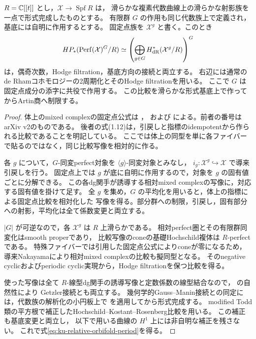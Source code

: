 \begin{lemma}[相対固定点比較]
\label{lem:ku-relative-orbifold-period}
$R=\mathbb C[[t]]$ とし，$\mathcal X\to\operatorname{Spf}R$ は，
滑らかな複素代数曲線上の滑らかな射影族を一点で形式完成したものとする。
有限群 $G$ の作用も同じ代数族上で定義され，基底には自明に作用するとする。
固定点族を $\mathcal X^g$ と書く。このとき
\begin{equation}\label{eq:ku-relative-orbifold-period}
 HP_*(\operatorname{Perf}(\mathcal X)^G/R)
 \simeq
 \left(\bigoplus_{g\in G}
 H^*_{\mathrm{dR}}(\mathcal X^g/R)\right)^G
\end{equation}
は，偶奇次数，Hodge filtration，基底方向の接続と両立する。
右辺には通常のde Rhamコホモロジーの2周期化とそのHodge filtrationを用いる。
ここで $G$ は固定点成分の添字に共役で作用する。
この比較を滑らかな形式基底上で作ってからArtin商へ制限する。
\end{lemma}
\begin{proof}
体上のmixed complexの固定点公式は
\cite[Theorem~1, Proposition~4]{Baranovsky2002}，
および\cite[Theorem~1.1, Corollary~1.5(ii), Example~1.11]{TabuadaVanDenBergh2018}
による。前者の番号はarXiv v2のものである。
後者の式(1.12)は，引戻しと指標のidempotentから作られる比較であることを明記している。
ここでは体上の同型を単に各ファイバーで貼るのではなく，同じ比較写像を相対的に作る。

各 $g$ について，$G$-同変perfect対象を $\langle g\rangle$-同変対象とみなし，
$i_g:\mathcal X^g\hookrightarrow\mathcal X$ で導来引戻しを行う。
固定点上では $g$ が底に自明に作用するので，対象を $g$ の固有値ごとに分解できる。
この各dg関手が誘導する相対mixed complexの写像に，対応する固有値を掛けて足す。
全 $g$ を集め，$G$ の平均化を用いると，体上の指標による固定点比較を相対化した
写像を得る。部分群への制限，引戻し，固有部分への射影，平均化は全て係数変更と両立する。

$|G|$ が可逆なので，各 $\mathcal X^g$ は $R$ 上滑らかである。
相対perfect圏とその有限群同変化はsmooth properであり，
比較写像のconeの基礎Hochschild複体は $R$-perfectである。
特殊ファイバーでは引用した固定点公式によりconeが零になるため，
導来Nakayamaにより相対mixed complexの比較も擬同型となる。
そのnegative cyclicおよびperiodic cyclic実現から，Hodge filtrationを保つ比較を得る。

使った写像は全て $R$-線型dg関手の誘導写像と定数係数の線型結合なので，
\cite[Theorem~3.32, Corollary~4.13]{Sheridan2020}の自然性により
Getzler接続とも両立する。
幾何学的Gauss--Manin接続との同定には，代数族の解析化の小円板上で
\cite[Theorem~0.1(3)]{Tu2024}を適用してから形式完成する。
modified Todd類の平方根で補正したHochschild--Kostant--Rosenberg比較を用いる。
この補正も基底変更と両立し，
以下で用いる曲線の $H^1$ 上には非自明な補正を残さない。
これで式\eqref{eq:ku-relative-orbifold-period}を得る。
\end{proof}

